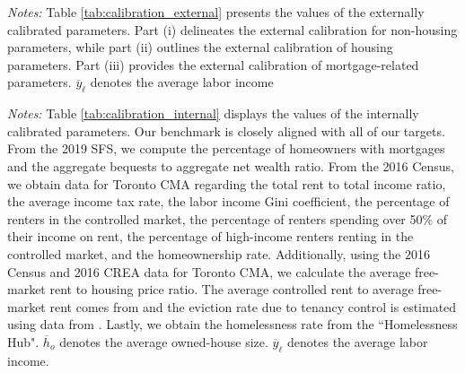 \documentclass[parskip=full]{article}
\newenvironment{fignote2}[1]
{
\par
\medskip
\begin{minipage}{#1}
\footnotesize
}
{
\end{minipage}
}
\begin{document}
\vspace{1cm}

\begin{table}[H]
    \centering
    \caption{Externally assigned parameter values}
    \vspace{-0.5cm}
    \label{tab:calibration_external}
    
    \vspace{-0.45cm}
    \begin{fignote2}{1.02\textwidth}
    \textit{Notes:} Table \ref{tab:calibration_external} presents the values of the externally calibrated parameters. Part (i) delineates the external calibration for non-housing parameters, while part (ii) outlines the external calibration of housing parameters. Part (iii) provides the external calibration of mortgage-related parameters. $\overline{y}_{\ell}$ denotes the average labor income
    \end{fignote2}
\end{table}

\begin{table}[H]
    \centering
    \caption{Internally assigned parameter values}
    \vspace{-0.5cm}
    \label{tab:calibration_internal}
    
    \vspace{-0.45cm}
    \begin{fignote2}{0.95\textwidth}
    \textit{Notes:} Table \ref{tab:calibration_internal} displays the values of the internally calibrated parameters. Our benchmark is closely aligned with all of our targets. From the 2019 SFS, we compute the percentage of homeowners with mortgages and the aggregate bequests to aggregate net wealth ratio.  From the 2016 Census, we obtain data for Toronto CMA regarding the total rent to total income ratio, the average income tax rate, the labor income Gini coefficient, the percentage of renters in the controlled market, the percentage of renters spending over 50\% of their income on rent, the percentage of high-income renters renting in the controlled market, and the homeownership rate. Additionally, using the 2016 Census and 2016 CREA data for Toronto CMA, we calculate the average free-market rent to housing price ratio. The average controlled rent to average free-market rent comes from \citet{zhang-gou} and the eviction rate due to tenancy control is estimated using data from \citet{LeonIveniuk2020}. Lastly, we obtain the homelessness rate from the ``Homelessness Hub". $\overline{h}_{o}$ denotes the average owned-house size. $\overline{y}_{\ell}$ denotes the average labor income.
    \end{fignote2}
\end{table}
\end{document}
